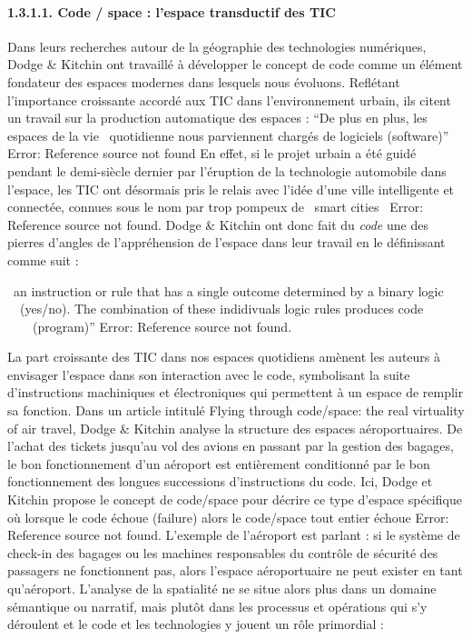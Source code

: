\paragraph[1.3.1.1. Code / space : l{}'espace transductif des TIC]{1.3.1.1. Code / space : l'espace transductif des TIC}
\hypertarget{RefHeading191699228146}{}{\color{black}
Dans leurs recherches autour de la g\'eographie des technologies num\'eriques, Dodge \& Kitchin ont travaill\'e \`a
d\'evelopper le concept de code comme un \'el\'ement fondateur des espaces modernes dans lesquels nous \'evoluons.
Refl\'etant l'importance croissante accord\'e aux TIC dans l'environnement urbain, ils citent un travail sur la
production automatique des espaces : ``De plus en plus, les espaces de la vie \ quotidienne nous parviennent charg\'es
de logiciels (software)'' Error: Reference source not found En effet, si le projet urbain a \'et\'e guid\'e pendant le
demi-si\`ecle dernier par l'\'eruption de la technologie automobile dans l'espace, les TIC ont d\'esormais pris le
relais avec l'id\'ee d'une ville intelligente et connect\'ee, connues sous le nom par trop pompeux de
{\guillemotleft}~smart cities~{\guillemotright} Error: Reference source not found. Dodge \& Kitchin ont donc fait du
\textit{code} une des pierres d'angles de l'appr\'ehension de l'espace dans leur travail en le d\'efinissant comme suit
: }


\bigskip

{\color{black}
{\guillemotleft}~an instruction or rule that has a single outcome determined by a binary logic \ \ (yes/no). The
combination of these indidivuals logic rules produces code \ \ \ \ (program)'' Error: Reference source not found.}


\bigskip

{\color{black}
La part croissante des TIC dans nos espaces quotidiens am\`enent les auteurs \`a envisager l'espace dans son interaction
avec le code, symbolisant la suite d'instructions machiniques et \'electroniques qui permettent \`a un espace de
remplir sa fonction. Dans un article intitul\'e Flying through code/space: the real virtuality of air travel, Dodge \&
Kitchin analyse la structure des espaces a\'eroportuaires. De l'achat des tickets jusqu'au vol des avions en passant
par la gestion des bagages, le bon fonctionnement d'un a\'eroport est enti\`erement conditionn\'e par le bon
fonctionnement des longues successions d'instructions du code. Ici, Dodge et Kitchin propose le concept de
code/space\textit{ }pour d\'ecrire ce type d'espace sp\'ecifique o\`u lorsque le code \'echoue (failure) alors le
code/space tout entier \'echoue Error: Reference source not found. L'exemple de l'a\'eroport est parlant : si le
syst\`eme de check-in des bagages ou les machines responsables du contr\^ole de s\'ecurit\'e des passagers ne
fonctionnent pas, alors l'espace a\'eroportuaire ne peut exister en tant qu'a\'eroport. L'analyse de la spatialit\'e ne
se situe alors plus dans un domaine s\'emantique ou narratif, mais plut\^ot dans les processus et op\'erations qui s'y
d\'eroulent et le code et les technologies y jouent un r\^ole primordial : }


